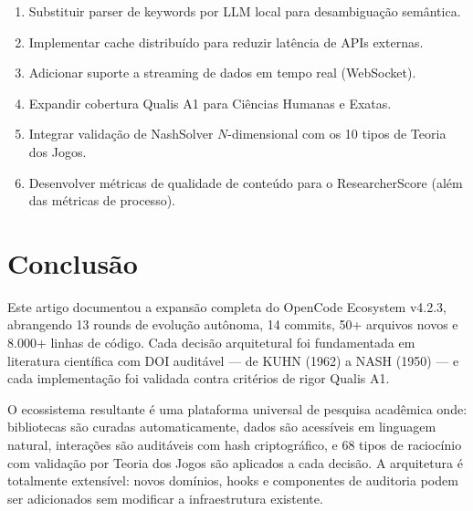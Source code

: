 \documentclass[12pt,a4paper]{article}
\begin{document}
\begin{enumerate}[itemsep=1pt]
  \item Substituir parser de keywords por LLM local para desambiguação semântica.
  \item Implementar cache distribuído para reduzir latência de APIs externas.
  \item Adicionar suporte a streaming de dados em tempo real (WebSocket).
  \item Expandir cobertura Qualis A1 para Ciências Humanas e Exatas.
  \item Integrar validação de NashSolver $N$-dimensional com os 10 tipos de Teoria dos Jogos.
  \item Desenvolver métricas de qualidade de conteúdo para o ResearcherScore (além das métricas de processo).
\end{enumerate}

\section{Conclusão}

Este artigo documentou a expansão completa do OpenCode Ecosystem v4.2.3, abrangendo 13 rounds de evolução autônoma, 14 commits, 50+ arquivos novos e 8.000+ linhas de código. Cada decisão arquitetural foi fundamentada em literatura científica com DOI auditável --- de KUHN (1962) a NASH (1950) --- e cada implementação foi validada contra critérios de rigor Qualis A1.

O ecossistema resultante é uma plataforma universal de pesquisa acadêmica onde: bibliotecas são curadas automaticamente, dados são acessíveis em linguagem natural, interações são auditáveis com hash criptográfico, e 68 tipos de raciocínio com validação por Teoria dos Jogos são aplicados a cada decisão. A arquitetura é totalmente extensível: novos domínios, hooks e componentes de auditoria podem ser adicionados sem modificar a infraestrutura existente.
\end{document}
